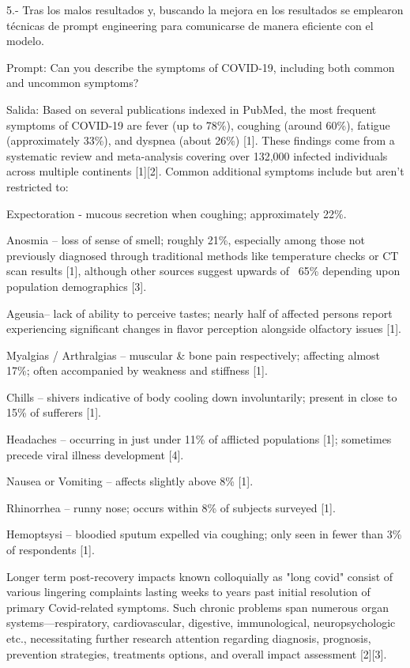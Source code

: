5.- Tras los malos resultados y, buscando la mejora en los resultados se emplearon técnicas de prompt engineering para comunicarse de manera eficiente con el modelo.

Prompt: Can you describe the symptoms of COVID-19, including both common and uncommon symptoms?

Salida: Based on several publications indexed in PubMed, the most frequent symptoms of COVID-19 are fever (up to 78\%), coughing (around 60\%), fatigue (approximately 33\%), and dyspnea (about 26\%) [1]. These findings come from a systematic review and meta-analysis covering over 132,000 infected individuals across multiple continents [1][2]. Common additional symptoms include but aren’t restricted to: 

Expectoration - mucous secretion when coughing; approximately 22\%.

Anosmia – loss of sense of smell; roughly 21\%, especially among those not previously diagnosed through traditional methods like temperature checks or CT scan results [1], although other sources suggest upwards of ~65\% depending upon population demographics [3].

Ageusia– lack of ability to perceive tastes; nearly half of affected persons report experiencing significant changes in flavor perception alongside olfactory issues [1].

Myalgias / Arthralgias – muscular \& bone pain respectively; affecting almost 17\%; often accompanied by weakness and stiffness [1].

Chills – shivers indicative of body cooling down involuntarily; present in close to 15\% of sufferers [1].

Headaches – occurring in just under 11\% of afflicted populations [1]; sometimes precede viral illness development [4].

Nausea or Vomiting – affects slightly above 8\% [1].

Rhinorrhea – runny nose; occurs within 8\% of subjects surveyed [1].

Hemoptsysi – bloodied sputum expelled via coughing; only seen in fewer than 3\% of respondents [1].

Longer term post-recovery impacts known colloquially as "long covid" consist of various lingering complaints lasting weeks to years past initial resolution of primary Covid-related symptoms. Such chronic problems span numerous organ systems—respiratory, cardiovascular, digestive, immunological, neuropsychologic etc., necessitating further research attention regarding diagnosis, prognosis, prevention strategies, treatments options, and overall impact assessment [2][3].


